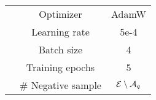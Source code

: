 \begin{table}[]
\begin{tabular}{@{}ccc@{}}
& Optimizer               & AdamW                \\
                                       & Learning rate            & 5e-4             \\
                                       & Batch size               & 4                    \\
                                       & Training epochs          & 5                    \\
                                       & \# Negative sample        & ${\mathcal{E}}\setminus {\mathcal{A}}_q$ \\ \bottomrule
\end{tabular}%
\end{table}